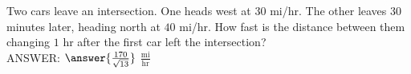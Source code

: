 \documentclass{ximera}
\begin{document}
\begin{exercise}
Two cars leave an intersection. One heads west at $30$ mi/hr. The other leaves 30 minutes later, heading north at $40$ mi/hr. How fast is the distance between them changing $1$ hr after the first car left the intersection?\\

ANSWER:  $\answer{\frac{170}{\sqrt{13}}}$ $\frac{\text{mi}}{\text{hr}}$

\end{exercise}
\end{document}
